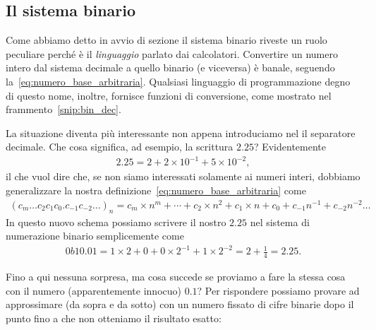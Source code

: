 \subsection{Il sistema binario}

Come abbiamo detto in avvio di sezione il sistema binario riveste un ruolo
peculiare perché è il \emph{linguaggio} parlato dai calcolatori. Convertire
un numero intero dal sistema decimale a quello binario (e viceversa) è
banale, seguendo la~\eqref{eq:numero_base_arbitraria}. Qualsiasi linguaggio
di programmazione degno di questo nome, inoltre, fornisce funzioni di
conversione, come mostrato nel frammento~\ref{snip:bin_dec}.


La situazione diventa più interessante non appena introduciamo nel 
il separatore decimale. Che cosa significa, ad esempio, la scrittura $2.25$?
Evidentemente
\begin{align*}
  2.25 = 2 + 2 \times 10^{-1} + 5 \times 10^{-2},
\end{align*}
il che vuol dire che, se non siamo interessati solamente ai numeri interi,
dobbiamo generalizzare la nostra definizione~\eqref{eq:numero_base_arbitraria}
come
\begin{align}
  (c_m\ldots c_2c_1c_0.c_{-1}c_{-2}\ldots)_n =
  c_m \times n^m + \cdots + c_2 \times n^2 +  c_1 \times n + c_0 +
  c_{-1} n^{-1} +   c_{-2} n^{-2} \ldots
\end{align}
In questo nuovo schema possiamo scrivere il nostro $2.25$ nel sistema di
numerazione binario semplicemente come
\begin{align*}
  0b10.01 = 1 \times 2 + 0 + 0 \times 2^{-1} + 1 \times 2^{-2} =
  2 + \frac{1}{4} = 2.25.
\end{align*}

Fino a qui nessuna sorpresa, ma cosa succede se proviamo a fare la stessa cosa
con il numero (apparentemente innocuo) $0.1$? Per rispondere possiamo provare
ad approssimare (da sopra e da sotto) con un numero fissato di cifre
binarie dopo il punto fino a che non otteniamo il risultato esatto:

